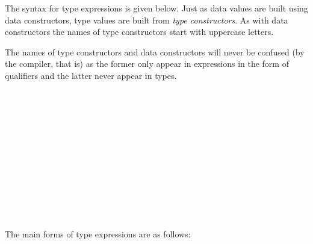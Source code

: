 The syntax for \frege{} type expressions is given below. Just as data values are built using data constructors, type values are built from \emph{type constructors}. As with data constructors the names of type constructors start with uppercase letters.

The names of type constructors and data constructors will never be confused (by the compiler, that is) as the former only appear in expressions in the form of qualifiers and the latter never appear in types.

\begin{flushleft}
     
   \alt{}  \\
  \sym {=>}    \alt{} \\
 \sym{(}  \sym{)} \sym{\arrow{}}   
  \alt{}  \sym{\arrow{}}                            
  \alt{}  \\
  
	\alt{} \sym{(}  \sym{)} \label{constraint}\\
   \\
  \sym{\arrow{}}  
  \alt {}\\
    
  \alt {}\\
  
  \alt {}           
  \alt \sym{(}  \sym{)}
  \alt \sym{(}  \sym{,}  \sym{)} 
  \alt \sym{\bracka{}}  \sym{\brackz{}}  \\
  \\
  
\alt{} \sym{(}  \sym{)} \\
 
  \alt \sym{\bracka\brackz}  
  \alt \sym{()}              
  \alt \sym{(}\more{\sym{,}}\sym{)} \\
 
\end{flushleft}

The main forms of type expressions are as follows:

